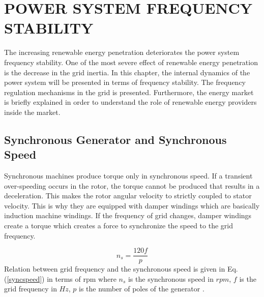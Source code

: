 \chapter{POWER SYSTEM FREQUENCY STABILITY}
\label{chp:2}
The increasing renewable energy penetration deteriorates the power system frequency stability. One of the most severe effect of renewable energy penetration is the decrease in the grid inertia. In this chapter, the internal dynamics of the power system will be presented in terms of frequency stability. The frequency regulation mechanisms in the grid is presented. Furthermore, the energy market is briefly explained in order to understand the role of renewable energy providers inside the market.
\section{Synchronous Generator and Synchronous Speed}
Synchronous machines produce torque only in synchronous speed. If a transient over-speeding occurs in the rotor, the torque cannot be produced that results in a deceleration. This makes the rotor angular velocity to strictly coupled to stator velocity. This is why they are equipped with damper windings which are basically induction machine windings. If the frequency of  grid changes, damper windings create a torque which creates a force to synchronize the speed to the grid frequency. \par
\begin{equation}
n_{s}=\frac{120f}{p}
\label{syncspeed}
\end{equation}
Relation between grid frequency and the synchronous speed is given in Eq. (\ref{syncspeed}) in terms of rpm where $n_{s}$ is the synchronous speed in $rpm$, $f$ is the grid frequency in $Hz$, $p$ is the number of poles of the generator \cite{Kundur}.

